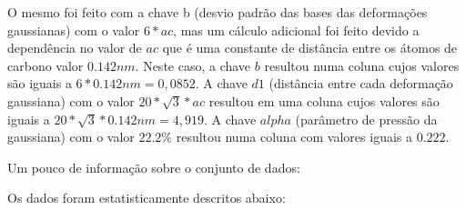 

O mesmo foi feito com a chave b (desvio padrão das bases das deformações gaussianas) com o valor $6*ac$, mas um cálculo adicional foi feito devido a dependência no valor de $ac$ que é uma constante de distância entre os átomos de carbono valor $0.142nm$. Neste caso, a chave $b$ resultou numa coluna cujos valores são iguais a $6*0.142nm = 0,0852$. A chave $d1$ (distância entre cada deformação gaussiana) com o valor $20*\sqrt{3}*ac$ resultou em uma coluna cujos valores são iguais a $20*\sqrt{3}*0.142nm=4,919$. A chave $alpha$ (parâmetro de pressão da gaussiana) com o valor $22.2\%$ resultou numa coluna com valores iguais a $0.222$.

Um pouco de informação sobre o conjunto de dados:



Os dados foram estatisticamente descritos abaixo:








